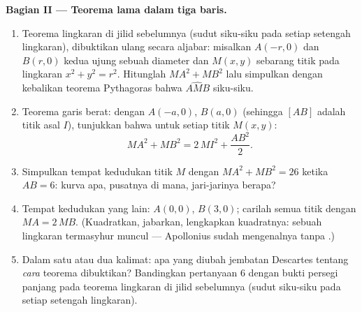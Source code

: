 \begin{problem}
\medskip
\noindent\textbf{Bagian II --- Teorema lama dalam tiga baris.}
\begin{enumerate}[resume]
  \item Teorema lingkaran di jilid sebelumnya (sudut siku-siku pada setiap
        setengah lingkaran), dibuktikan ulang secara aljabar: misalkan
        $A(-r, 0)$ dan $B(r, 0)$ kedua ujung sebuah diameter dan $M(x, y)$
        sebarang titik pada lingkaran $x^2 + y^2 = r^2$. Hitunglah
        $MA^2 + MB^2$ lalu simpulkan dengan kebalikan teorema Pythagoras
        bahwa $\widehat{AMB}$ siku-siku.
  \item Teorema garis berat: dengan $A(-a, 0)$, $B(a, 0)$ (sehingga
         $[AB]$ adalah titik asal $I$), tunjukkan bahwa untuk
        setiap titik $M(x, y)$:
        \[
        MA^2 + MB^2 = 2\,MI^2 + \frac{AB^2}{2} .
        \]
  \item Simpulkan tempat kedudukan titik $M$ dengan
        $MA^2 + MB^2 = 26$ ketika $AB = 6$: kurva apa, pusatnya di mana,
        jari-jarinya berapa?
  \item Tempat kedudukan yang lain: $A(0,0)$, $B(3,0)$; carilah semua titik
        dengan $MA = 2\,MB$. (Kuadratkan, jabarkan, lengkapkan
        kuadratnya: sebuah lingkaran termasyhur muncul --- Apollonius sudah
        mengenalnya tanpa .)
  \item Dalam satu atau dua kalimat: apa yang diubah jembatan Descartes
        tentang \emph{cara} teorema dibuktikan? Bandingkan
        pertanyaan 6 dengan bukti persegi panjang pada teorema lingkaran
        di jilid sebelumnya (sudut siku-siku pada setiap setengah lingkaran).
\end{enumerate}


\end{problem}
